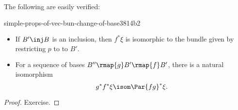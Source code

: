 The following are easily verified:
\begin{prop}{simple-props-of-vec-bun-change-of-base}{3814b2}
  \hfill
  \begin{itemize}
    \item If $B' \inj B$ is an inclusion, then $f^*\xi$ is isomorphic
          to the bundle given by restricting $p$ to to $B'$.
    \item For a sequence of bases $B'' \rmap{g} B' \rmap{f} B'$, there is
          a natural isomorphism
          \[ g^* f^* \xi \isom \Par{fg}^* \xi. \] 
  \end{itemize}
\end{prop}
\begin{proof}
  Exercise. %
\end{proof}


\makeatletter{}\makeatother
